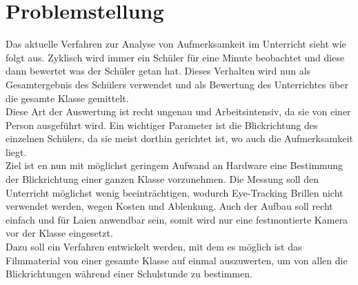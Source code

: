 \section{Problemstellung}
\label{Problemstellung}
Das aktuelle Verfahren zur Analyse von Aufmerksamkeit im Unterricht sieht wie folgt aus. Zyklisch wird immer ein Schüler für eine Minute beobachtet und diese dann bewertet was der Schüler getan hat. Dieses Verhalten wird nun als Gesamtergebnis des Schülers verwendet und als Bewertung des Unterrichtes über die gesamte Klasse gemittelt.\\
Diese Art der Auswertung ist recht ungenau und Arbeitsintensiv, da sie von einer Person ausgeführt wird. Ein wichtiger Parameter ist die Blickrichtung des einzelnen Schülers, da sie meist dorthin gerichtet ist, wo auch die Aufmerksamkeit liegt.\\
Ziel ist en nun mit möglichst geringem Aufwand an Hardware eine Bestimmung der Blickrichtung einer ganzen Klasse vorzunehmen. Die Messung soll den Unterricht möglichst wenig beeinträchtigen, wodurch Eye-Tracking Brillen nicht verwendet werden, wegen Kosten und Ablenkung. Auch der Aufbau soll recht einfach und für Laien anwendbar sein, somit wird nur eine festmontierte Kamera vor der Klasse eingesetzt.\\
Dazu soll ein Verfahren entwickelt werden, mit dem es möglich ist das Filmmaterial von einer gesamte Klasse auf einmal auszuwerten, um von allen die Blickrichtungen während einer Schulstunde zu bestimmen.\\
\cite{MAI_Verhaltensbeobachtung}
